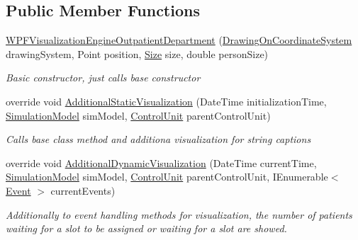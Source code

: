 \subsection*{Public Member Functions}
\begin{DoxyCompactItemize}
\item 
\hyperlink{class_sample_hospital_model_1_1_visualization_1_1_w_p_f_visualization_engine_outpatient_department_a50cbb97ee541ebb20c7ce54fb48960ed}{W\+P\+F\+Visualization\+Engine\+Outpatient\+Department} (\hyperlink{class_w_p_f_visualization_base_1_1_drawing_on_coordinate_system}{Drawing\+On\+Coordinate\+System} drawing\+System, Point position, \hyperlink{class_sample_hospital_model_1_1_visualization_1_1_w_p_f_visualization_engine_health_care_department_control_unit_abe4ba0d78d527ff6c4cdde7dd27943fc}{Size} size, double person\+Size)
\begin{DoxyCompactList}\small\item\em Basic constructor, just calls base constructor \end{DoxyCompactList}\item 
override void \hyperlink{class_sample_hospital_model_1_1_visualization_1_1_w_p_f_visualization_engine_outpatient_department_af8be5c28237bb4fc3261b13bcdb5aa45}{Additional\+Static\+Visualization} (Date\+Time initialization\+Time, \hyperlink{class_simulation_core_1_1_simulation_classes_1_1_simulation_model}{Simulation\+Model} sim\+Model, \hyperlink{class_simulation_core_1_1_h_c_c_m_elements_1_1_control_unit}{Control\+Unit} parent\+Control\+Unit)
\begin{DoxyCompactList}\small\item\em Calls base class method and additiona visualization for string captions \end{DoxyCompactList}\item 
override void \hyperlink{class_sample_hospital_model_1_1_visualization_1_1_w_p_f_visualization_engine_outpatient_department_ab14586d925c0fcb7c6d77394fe4c8d65}{Additional\+Dynamic\+Visualization} (Date\+Time current\+Time, \hyperlink{class_simulation_core_1_1_simulation_classes_1_1_simulation_model}{Simulation\+Model} sim\+Model, \hyperlink{class_simulation_core_1_1_h_c_c_m_elements_1_1_control_unit}{Control\+Unit} parent\+Control\+Unit, I\+Enumerable$<$ \hyperlink{class_simulation_core_1_1_h_c_c_m_elements_1_1_event}{Event} $>$ current\+Events)
\begin{DoxyCompactList}\small\item\em Additionally to event handling methods for visualization, the number of patients waiting for a slot to be assigned or waiting for a slot are showed. \end{DoxyCompactList}\end{DoxyCompactItemize}
